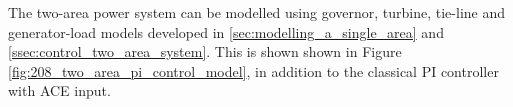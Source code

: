 The two-area power system can be modelled using governor, turbine, tie-line and generator-load models developed in \textsection \ref{sec:modelling_a_single_area} and \textsection \ref{ssec:control_two_area_system}. This is shown shown in Figure \ref{fig:208_two_area_pi_control_model}, in addition to the classical PI controller with ACE input.

\clearpage

\begin{sidewaysfigure}[ht]
\centering
\resizebox{22cm}{!}{}
\caption[Two area power system with PI feedback control]{A classical feedback control approach to a two area power system \cite{Kundur1994}.}
\label{fig:208_two_area_pi_control_model}
\end{sidewaysfigure}

\clearpage
